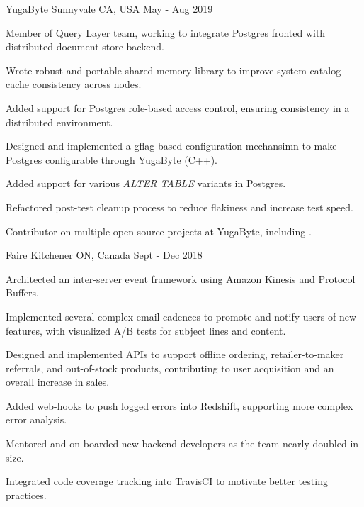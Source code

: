
\begin{cventries}

   {YugaByte} {Sunnyvale CA, USA} {May - Aug
    2019} {
    \begin{cvitems}
    \item Member of Query Layer team, working to integrate Postgres fronted with
      distributed document store backend.
    \item Wrote robust and portable shared memory library to improve system
      catalog cache consistency across nodes.
    \item Added support for Postgres role-based access control, ensuring
      consistency in a distributed environment.
    \item Designed and implemented a gflag-based configuration mechansimn to
      make Postgres configurable through YugaByte (C++).
    \item Added support for various \textit{ALTER TABLE} variants in Postgres.
    \item Refactored post-test cleanup process to reduce flakiness and increase
      test speed.
    \item Contributor on multiple open-source projects at YugaByte, including
      \thinspace
      \href{https://github.com/YugaByte/yugabyte-db/commits?author=srhickma}{\color[HTML]{3090C7}{yugabyte-db
          \faExternalLink}}.
    \end{cvitems}
  }

   {Faire} {Kitchener ON, Canada} {Sept - Dec
    2018} {
    \begin{cvitems}
    \item Architected an inter-server event framework using Amazon Kinesis and
      Protocol Buffers.
    \item Implemented several complex email cadences to promote and notify users
      of new features, with visualized A/B tests for subject lines and content.
    \item Designed and implemented APIs to support offline ordering,
      retailer-to-maker referrals, and out-of-stock products, contributing to
      user acquisition and an overall increase in sales.
    \item Added web-hooks to push logged errors into Redshift, supporting more
      complex error analysis.
    \item Mentored and on-boarded new backend developers as the team nearly
      doubled in size.
    \item Integrated code coverage tracking into TravisCI to motivate better
      testing practices.
    \end{cvitems}
  }
    

\end{cventries}
